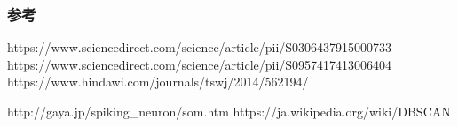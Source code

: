 \documentclass[dvipdfmx,11pt,notheorems]{beamer}
\theoremstyle{definition}
\begin{document}
\begin{frame}\frametitle{参考}
https://www.sciencedirect.com/science/article/pii/S0306437915000733
https://www.sciencedirect.com/science/article/pii/S0957417413006404
https://www.hindawi.com/journals/tswj/2014/562194/

http://gaya.jp/spiking\_neuron/som.htm
https://ja.wikipedia.org/wiki/DBSCAN
\end{frame}
\end{document}
